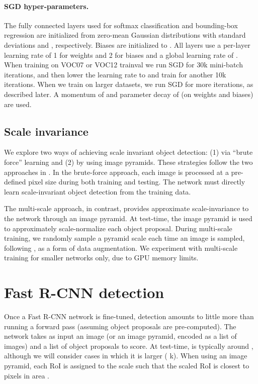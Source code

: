 \documentclass[10pt,twocolumn,letterpaper]{article}
\newcommand{\roi}{RoI\xspace}
\begin{document}
\paragraph{SGD hyper-parameters.}
The fully connected layers used for softmax classification and bounding-box regression are initialized from zero-mean Gaussian distributions with standard deviations  and , respectively.
Biases are initialized to .
All layers use a per-layer learning rate of 1 for weights and 2 for biases and a global learning rate of .
When training on VOC07 or VOC12 trainval we run SGD for 30k mini-batch iterations, and then lower the learning rate to  and train for another 10k iterations.
When we train on larger datasets, we run SGD for more iterations, as described later.
A momentum of  and parameter decay of  (on weights and biases) are used.





\subsection{Scale invariance}
We explore two ways of achieving scale invariant object detection: (1) via ``brute force'' learning and (2) by using image pyramids.
These strategies follow the two approaches in \cite{he2014spp}.
In the brute-force approach, each image is processed at a pre-defined pixel size during both training and testing.
The network must directly learn scale-invariant object detection from the training data.

The multi-scale approach, in contrast, provides approximate scale-invariance to the network through an image pyramid.
At test-time, the image pyramid is used to approximately scale-normalize each object proposal.
During multi-scale training, we randomly sample a pyramid scale each time an image is sampled, following \cite{he2014spp}, as a form of data augmentation.
We experiment with multi-scale training for smaller networks only, due to GPU memory limits.

\section{Fast R-CNN detection}
Once a Fast R-CNN network is fine-tuned, detection amounts to little more than running a forward pass (assuming object proposals are pre-computed).
The network takes as input an image (or an image pyramid, encoded as a list of images) and a list of  object proposals to score.
At test-time,  is typically around , although we will consider cases in which it is larger ( k).
When using an image pyramid, each \roi is assigned to the scale such that the scaled \roi is closest to  pixels in area \cite{he2014spp}.
\end{document}
